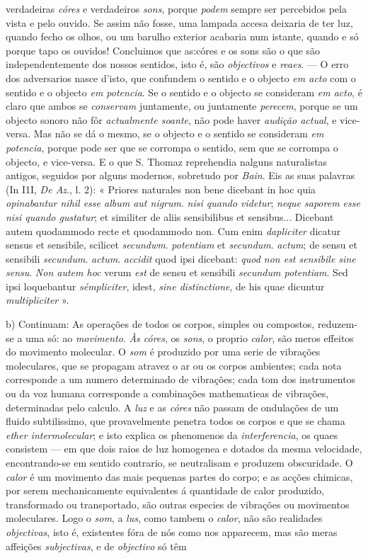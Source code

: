 verdadeiras \emph{córes} e verdadeiros \emph{sons}, porque \emph{podem} sempre ser percebidos pela vista e pelo ouvido. Se assim não fosse, uma lampada accesa deixaria de ter luz, quando fecho os olhos, ou um barulho exterior acabaria num istante, quando e só porque tapo os ouvidos! Concluimos que as:córes e os sons são o que são independentemente dos nossos sentidos, isto é, são \emph{objectivos} e \emph{reaes}. --- O erro dos adversarios nasce d'isto, que confundem o sentido e o objecto \emph{em acto} com o sentido e o objecto \emph{em potencia}. Se o sentido e o objecto se consideram \emph{em acto}, é claro que ambos se \emph{conservam} juntamente, ou juntamente \emph{perecem}, porque se um objecto sonoro não fôr \emph{actualmente soante}, não pode haver \emph{audição actual}, e vice-versa. Mas não se dá o mesmo, se o objecto e o sentido se consideram \emph{em potencia}, porque pode ser que se corrompa o sentido, sem que se corrompa o objecto, e vice-versa. E o que S. Thomaz reprehendia nalguns naturalistas antigos, seguidos por alguns modernos, sobretudo por \emph{Bain}. Eis as suas palavras (In I1I, \emph{De Az}., l. 2): « Priores naturales non bene dicebant in hoc quia \emph{opinabantur nihil esse album aut nigrum}. \emph{nisi quando videtur}; \emph{neque saporem esse nisi quando gustatur}; et similiter de aliis sensibilibus et sensibus... Dicebant autem quodammodo recte et quodammodo non. Cum enim \emph{dapliciter} dicatur sensus et sensibile, scilicet \emph{secundwm}. \emph{potentiam} et \emph{secundum}. \emph{actum}; de sensu et sensibili \emph{secundum}. \emph{actum}. \emph{accidit} quod ipsi dicebant: \emph{quod non est sensibile sine sensu}. \emph{Non autem hoc} verum \emph{est} de sensu et sensibili \emph{secundum potentiam}. Sed ipsi loquebantur \emph{sémpliciter}, idest, \emph{sine distinctione}, de his quae dicuntur \emph{multipliciter} ».\par b) Continuam: As operações de todos os corpos, simples ou compostos, reduzem-se a uma só: ao \emph{movimento}. \emph{Às córes}, os \emph{sons}, o proprio \emph{calor}, são meros effeitos do movimento molecular. O \emph{som} é produzido por uma serie de vibrações moleculares, que se propagam atravez o ar ou os corpos ambientes; cada nota corresponde a um numero determinado de vibrações; cada tom dos instrumentos ou da voz humana corresponde a combinações mathematieas de vibrações, determinadas pelo calculo. A \emph{luz} e as \emph{córes} não passam de ondulações de um fluido subtilissimo, que provavelmente penetra todos os corpos e que se chama \emph{ether intermolecular}; e isto explica os phenomenos da \emph{interferencia}, os quaes consistem --- em que dois raios de luz homogenea e dotados da mesma velocidade, encontrando-se em sentido contrario, se neutralisam e produzem obscuridade. O \emph{calor} é um movimento das mais pequenas partes do corpo; e as acções chimicas, por serem mechanicamente equivalentes á quantidade de calor produzido, transformado ou transportado, são outras especies de vibrações ou movimentos moleculares. Logo o \emph{som}, a \emph{lus}, como tambem o \emph{calor}, não são realidades \emph{objectivas}, isto é, existentes fóra de nós como nos apparecem, mas são meras affeições \emph{subjectivas}, e de \emph{objectivo} só têm 